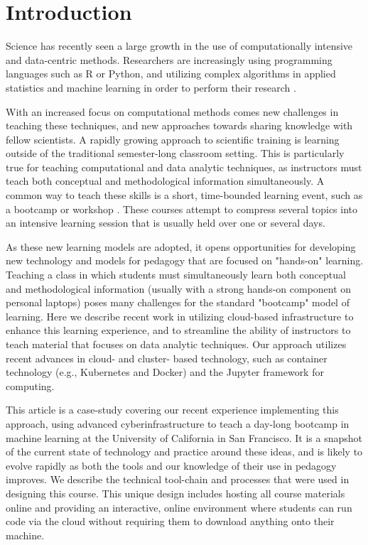\section{Introduction}

Science has recently seen a large growth in the use of
computationally intensive and data-centric methods. Researchers are
increasingly using programming languages such as R or Python, and utilizing
complex algorithms in applied statistics and machine learning in order to
perform their research \cite{momcheva2015astro}.

With an increased focus on computational methods
comes new challenges in teaching these techniques, and new approaches
towards sharing knowledge with fellow scientists.
A rapidly growing approach to scientific training is learning
outside of the traditional semester-long classroom setting.
This is particularly true
for teaching computational and data analytic techniques,
as instructors must teach both conceptual and methodological information
simultaneously. A common way to teach these skills is a short,
time-bounded learning event, such as a bootcamp or workshop
\cite{wilson2016software}. These  courses attempt to compress several
topics into an intensive learning session that is usually held over one or
several days.

As these new learning models are adopted, it opens
opportunities for developing new technology and models for pedagogy that are
focused on "hands-on" learning. Teaching a class in which students
must simultaneously learn both conceptual and methodological information
(usually with a strong hands-on component on personal laptops) poses
many challenges for the standard "bootcamp" model of
learning. Here we describe
recent work in utilizing cloud-based infrastructure to enhance this learning
experience, and to streamline the ability of instructors to
teach material that focuses on data analytic techniques. Our approach
utilizes recent advances in cloud- and cluster- based technology, such
as container technology (e.g., Kubernetes and Docker) and the
Jupyter framework for computing. 

This article is a case-study covering our recent experience implementing this approach, using
advanced cyberinfrastructure to teach a day-long bootcamp in machine learning at
the University of California in San Francisco. It is a snapshot of the current state
of technology and practice around these ideas, and is likely to evolve rapidly
as both the tools and our knowledge of their use in pedagogy improves.
We describe the technical tool-chain and processes that were used in
designing this course. This
unique design includes hosting all course materials online and providing
an interactive, online environment where students can run code via the cloud
without requiring them to download anything onto their machine.

